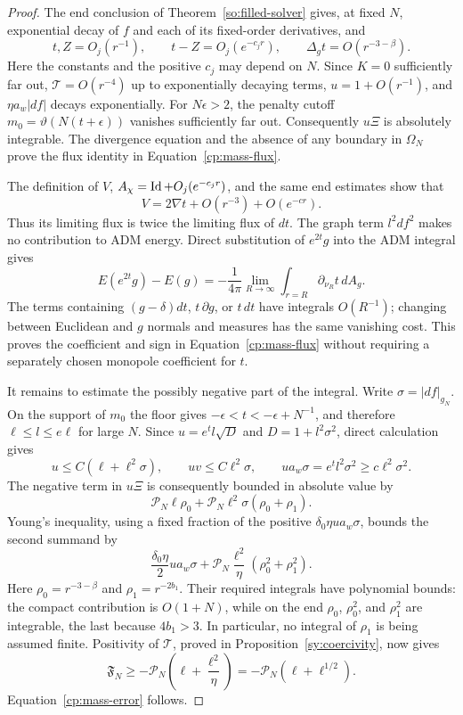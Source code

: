 \begin{proof}
The end conclusion of Theorem~\ref{so:filled-solver} gives, at fixed
$N$, exponential decay of $f$ and each of its fixed-order derivatives,
and
\[
 t,Z=O_j(r^{-1}),\qquad t-Z=O_j(e^{-c_jr}),\qquad
 \Delta_g t=O(r^{-3-\beta}).
\]
Here the constants and the positive $c_j$ may depend on $N$.
Since $K=0$ sufficiently far out, $\mathcal T=O(r^{-4})$ up to
exponentially decaying terms, $u=1+O(r^{-1})$, and
$\eta a_w|df|$ decays exponentially.  For $N\epsilon>2$, the penalty
cutoff $m_0=\vartheta(N(t+\epsilon))$ vanishes sufficiently far out.
Consequently $u\Xi$ is absolutely integrable.  The divergence equation
and the absence of any boundary in $\Omega_N$ prove the flux identity
in Equation~\eqref{cp:mass-flux}.

The definition of $V$, $A_\chi=\operatorname{Id}+O_j(e^{-c_jr})$, and the same end
estimates show that
\[
 V=2\nabla t+O(r^{-3})+O(e^{-cr}).
\]
Thus its limiting flux is twice the limiting flux of $dt$.  The graph
term $l^2df^2$ makes no contribution to ADM energy.  Direct substitution
of $e^{2t}g$ into the ADM integral gives
\[
 E(e^{2t}g)-E(g)
 =-\frac1{4\pi}\lim_{R\to\infty}
       \int_{r=R}\partial_{\nu_R}t\,dA_g.
\]
The terms containing $(g-\delta)dt$, $t\,\partial g$, or $t\,dt$
have integrals $O(R^{-1})$; changing between Euclidean and $g$ normals
and measures has the same vanishing cost.  This proves the coefficient
and sign in Equation~\eqref{cp:mass-flux} without requiring a separately
chosen monopole coefficient for $t$.

It remains to estimate the possibly negative part of the integral.
Write $\sigma=|df|_{g_N}$.  On the support of $m_0$ the floor gives
$-\epsilon<t<-\epsilon+N^{-1}$, and therefore
$\ell\le l\le e\ell$ for large $N$.  Since $u=e^t l\sqrt D$ and
$D=1+l^2\sigma^2$, direct calculation gives
\begin{equation}\label{cp:penalty-weights}
 u\le C(\ell+\ell^2\sigma),\qquad
 uv\le C\ell^2\sigma,\qquad
 u a_w\sigma=e^tl^2\sigma^2\ge c\ell^2\sigma^2.
\end{equation}
The negative term in $u\Xi$ is consequently bounded in absolute value
by
\[
 \mathcal P_N\ell\rho_0
   +\mathcal P_N\ell^2\sigma(\rho_0+\rho_1).
\]
Young's inequality, using a fixed fraction of the positive
$\delta_0\eta u a_w\sigma$, bounds the second summand by
\[
 \frac{\delta_0\eta}{2}u a_w\sigma
     +\mathcal P_N\frac{\ell^2}{\eta}
                        (\rho_0^2+\rho_1^2).
\]
Here $\rho_0=r^{-3-\beta}$ and $\rho_1=r^{-2b_1}$.  Their required
integrals have polynomial bounds: the compact contribution is
$O(1+N)$, while on the end $\rho_0$, $\rho_0^2$, and $\rho_1^2$ are
integrable, the last because $4b_1>3$.  In particular, no integral of
$\rho_1$ is being assumed finite.  Positivity of $\mathcal T$, proved
in Proposition~\ref{sy:coercivity}, now gives
\[
 \mathfrak F_N\ge
 -\mathcal P_N\left(\ell+\frac{\ell^2}{\eta}\right)
 =-\mathcal P_N(\ell+\ell^{1/2}).
\]
Equation~\eqref{cp:mass-error} follows.
\end{proof}

